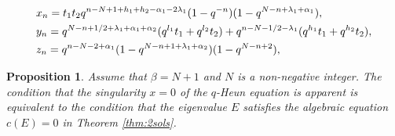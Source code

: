 \documentclass[10pt,a4paper]{amsart}
\newtheorem{prop}{Proposition}
\begin{document}
\begin{align}
 & x_n =t_{1}t_{2} q^{ n - N +1 + h_{1} + h_{2} - \alpha _1 - 2 \lambda _1 } (1 - q^{-n})(1 - q^{N-n + \lambda _1 + \alpha _1 }) ,   \\
 & y_n =  q^{N -n + 1/2 + \lambda _1 + \alpha_{1} + \alpha_{2} } (q^{l_{1}}t_{1} + q^{l_{2}}t_{2}) + q^{n- N-1/2  - \lambda _1} (q^{h_{1}}t_{1} + q^{h_{2}}t_{2})  , \notag \\
 & z_n = q^{ n - N-2 + \alpha_{1}  } (1 - q^{N -n +1 +\lambda _1 + \alpha_{2}  })(1 - q^{N- n + 2}), \notag
\end{align}

\begin{prop} 
Assume that $\beta = N +1 $ and $N$ is a non-negative integer.
The condition that the singularity $x=0$ of the $q$-Heun equation is apparent is equivalent to the condition that the eigenvalue $E$ satisfies the algebraic equation $c(E)=0$ in Theorem \ref{thm:2sols}.
\end{prop}
\end{document}

